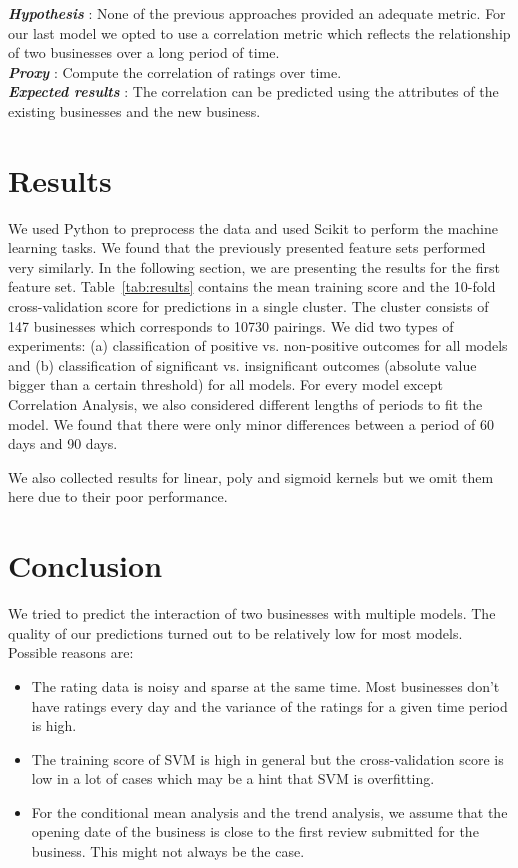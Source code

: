 \documentclass{vldb}
\begin{document}
\textbf{\textit{Hypothesis}} : None of the previous approaches provided an adequate metric.
For our last model we opted to use a correlation metric which reflects the relationship of two businesses over a long period of time.\\
\textbf{\textit{Proxy}} : Compute the correlation of ratings over time.\\
\textbf{\textit{Expected results}} : The correlation can be predicted using the attributes of the existing businesses and the new business. 


\section{Results}
%
We used Python to preprocess the data and used Scikit \cite{pedregosa2011scikit} to perform the machine learning tasks.
We found that the previously presented feature sets performed very similarly. In the following section, we are presenting the results for the first feature set.
Table~\ref{tab:results} contains the mean training score and the 10-fold cross-validation score for predictions in a single cluster.
The cluster consists of 147 businesses which corresponds to 10730 pairings.
We did two types of experiments: (a) classification of positive vs. non-positive outcomes for all models and (b) classification of significant vs. insignificant outcomes (absolute value bigger than a certain threshold) for all models.
For every model except Correlation Analysis, we also considered different lengths of periods to fit the model.
We found that there were only minor differences between a period of 60 days and 90 days.

We also collected results for linear, poly and sigmoid kernels but we omit them here due to their poor performance.

\section{Conclusion}
We tried to predict the interaction of two businesses with multiple models.
The quality of our predictions turned out to be relatively low for most models.
Possible reasons are:
\begin{itemize}
\item The rating data is noisy and sparse at the same time. Most businesses don't have ratings every day and the variance of the ratings for a given time period is high.
\item The training score of SVM is high in general but the cross-validation score is low in a lot of cases which may be a hint that SVM is overfitting.
\item For the conditional mean analysis and the trend analysis, we assume that the opening date of the business is close to the first review submitted for the business. This might not always be the case.
\end{itemize}
\end{document}
